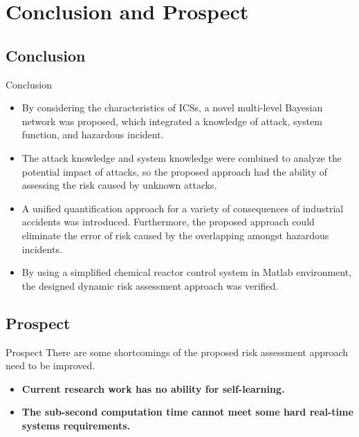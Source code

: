 \label{Section: Conclusion and Prospect}
\section{Conclusion and Prospect}
\subsection{Conclusion}
\begin{frame}{Conclusion}
    \label{Conclusion and Prospect: Conclusion}
    \begin{itemize}[<+->]
      \item By considering the characteristics of ICSs, a novel multi-level Bayesian network was proposed, which integrated a knowledge of attack, system function, and hazardous incident.
      \item The attack knowledge and system knowledge were combined to analyze the potential impact of attacks, so the proposed approach had the ability of assessing the risk caused by unknown attacks.
      \item A unified quantification approach for a variety of consequences of industrial accidents was introduced. Furthermore, the proposed approach could eliminate the error of risk caused by the overlapping amongst hazardous incidents.
      \item By using a simplified chemical reactor control system in Matlab environment, the designed dynamic risk assessment approach was verified.
    \end{itemize}
\end{frame}

\subsection{Prospect}
\begin{frame}{Prospect}
    \label{Conclusion and Prospect: Prospect}
    There are some shortcomings of the proposed risk assessment approach need to be improved.
    \begin{itemize}[<+->]
      \item \textbf{Current research work has no ability for self-learning.}
      \item \textbf{The sub-second computation time cannot meet some hard real-time systems requirements.}
    \end{itemize}
\end{frame}
